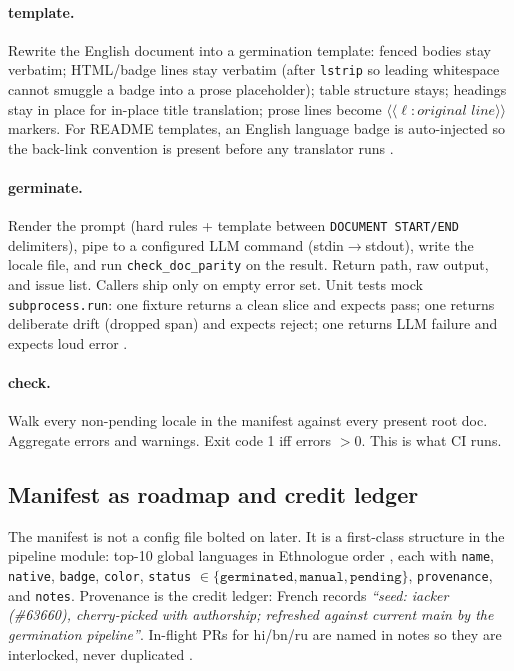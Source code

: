 \documentclass[11pt]{article}
\theoremstyle{definition}
\theoremstyle{plain}
\theoremstyle{remark}
\begin{document}
\paragraph{template.}
Rewrite the English document into a germination template: fenced bodies stay
verbatim; HTML/badge lines stay verbatim (after \texttt{lstrip} so leading
whitespace cannot smuggle a badge into a prose placeholder); table structure
stays; headings stay in place for in-place title translation; prose lines
become $\langle\!\langle\ell:\textit{original line}\rangle\!\rangle$ markers.
For README templates, an English language badge is auto-injected so the
back-link convention is present before any translator runs
\citep{hermespr80391}.

\paragraph{germinate.}
Render the prompt (hard rules + template between \texttt{DOCUMENT START/END}
delimiters), pipe to a configured LLM command (stdin$\to$stdout), write the
locale file, and run \texttt{check\_doc\_parity} on the result. Return path,
raw output, and issue list. Callers ship only on empty error set. Unit tests
mock \texttt{subprocess.run}: one fixture returns a clean slice and expects
pass; one returns deliberate drift (dropped span) and expects reject; one
returns LLM failure and expects loud error \citep{hermespr80391}.

\paragraph{check.}
Walk every non-pending locale in the manifest against every present root doc.
Aggregate errors and warnings. Exit code 1 iff errors $> 0$. This is what CI
runs.

\subsection{Manifest as roadmap and credit ledger}

The manifest is not a config file bolted on later. It is a first-class
structure in the pipeline module: top-10 global languages in Ethnologue order
\citep{ethnologue}, each with \texttt{name}, \texttt{native}, \texttt{badge},
\texttt{color}, \texttt{status}
$\in \{\texttt{germinated}, \texttt{manual}, \texttt{pending}\}$,
\texttt{provenance}, and \texttt{notes}. Provenance is the credit ledger:
French records \emph{``seed: iacker (\#63660), cherry-picked with authorship;
refreshed against current main by the germination pipeline''}. In-flight PRs
for hi/bn/ru are named in notes so they are interlocked, never duplicated
\citep{hermesepic80392}.
\end{document}
